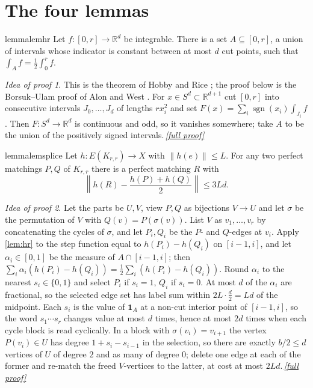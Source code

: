 \documentclass[11pt,a4paper]{article}
\theoremstyle{plain}
\theoremstyle{definition}
\theoremstyle{remark}
\newtheorem*{proofidea}{Idea of proof}
\newcommand{\fullproofref}[1]{\,\hyperref[#1]{\textit{[full proof]}}}
\newcommand{\R}{\mathbb R}
\newcommand{\sgn}{\operatorname{sgn}}
\newcommand{\vone}{\mathbf 1}
\newcommand{\norm}[1]{\left\|#1\right\|}
\begin{document}
\section{The four lemmas}\label{sec:lemmas}

\begin{restatable}{lemma}{lemhr}\label{lem:hr}
Let $f\colon[0,r]\to\R^d$ be integrable. There is a set $A\subseteq[0,r]$, a union of intervals whose indicator is constant between at most $d$ cut points, such that $\int_Af=\frac12\int_0^rf$.
\end{restatable}
\begin{proofidea}
This is the theorem of Hobby and Rice \cite{HobbyRice65}; the proof below is the Borsuk--Ulam proof of Alon and West \cite{AlonWest86}. For $x\in S^d\subset\R^{d+1}$ cut $[0,r]$ into consecutive intervals $J_0,\dots,J_d$ of lengths $rx_i^2$ and set $F(x)=\sum_i\sgn(x_i)\int_{J_i}f$. Then $F\colon S^d\to\R^d$ is continuous and odd, so it vanishes somewhere; take $A$ to be the union of the positively signed intervals.\fullproofref{pf:hr}
\end{proofidea}

\begin{restatable}{lemma}{lemsplice}\label{lem:splice}
Let $h\colon E(K_{r,r})\to X$ with $\|h(e)\|\le L$. For any two perfect matchings $P,Q$ of $K_{r,r}$ there is a perfect matching $R$ with
\[
 \norm{h(R)-\frac{h(P)+h(Q)}2}\le 3Ld .
\]
\end{restatable}
\begin{proofidea}
Let the parts be $U,V$, view $P,Q$ as bijections $V\to U$ and let $\sigma$ be the permutation of $V$ with $Q(v)=P(\sigma(v))$. List $V$ as $v_1,\dots,v_r$ by concatenating the cycles of $\sigma$, and let $P_i,Q_i$ be the $P$- and $Q$-edges at $v_i$. Apply \cref{lem:hr} to the step function equal to $h(P_i)-h(Q_i)$ on $[i-1,i]$, and let $\alpha_i\in[0,1]$ be the measure of $A\cap[i-1,i]$; then $\sum_i\alpha_i(h(P_i)-h(Q_i))=\frac12\sum_i(h(P_i)-h(Q_i))$. Round $\alpha_i$ to the nearest $s_i\in\{0,1\}$ and select $P_i$ if $s_i=1$, $Q_i$ if $s_i=0$. At most $d$ of the $\alpha_i$ are fractional, so the selected edge set has label sum within $2L\cdot\frac d2=Ld$ of the midpoint. Each $s_i$ is the value of $\vone_A$ at a non-cut interior point of $[i-1,i]$, so the word $s_1\cdots s_r$ changes value at most $d$ times, hence at most $2d$ times when each cycle block is read cyclically. In a block with $\sigma(v_i)=v_{i+1}$ the vertex $P(v_i)\in U$ has degree $1+s_i-s_{i-1}$ in the selection, so there are exactly $b/2\le d$ vertices of $U$ of degree $2$ and as many of degree $0$; delete one edge at each of the former and re-match the freed $V$-vertices to the latter, at cost at most $2Ld$.\fullproofref{pf:splice}
\end{proofidea}
\end{document}
